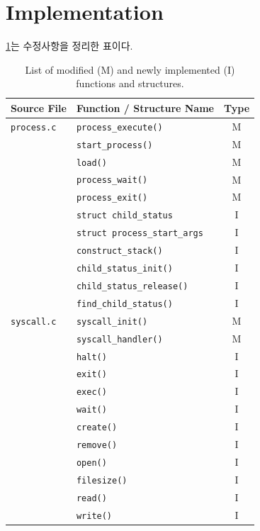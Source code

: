 \documentclass[conference]{IEEEtran}
\newcommand{\codefont}[1]{\texttt{\color{darkmagenta}#1}}
\begin{document}
\section{Implementation}
\cref{tab:implementation_list}는 수정사항을 정리한 표이다.
\begin{table}[htbp]
    \centering
    \caption{List of modified (M) and newly implemented (I) functions and structures.}
    \label{tab:implementation_list}
    \begin{tabular}{llc}
        \toprule
        \textbf{Source File} & \textbf{Function / Structure Name} & \textbf{Type} \\
        \midrule
        \texttt{process.c} & \codefont{process\_execute()} & M \\
        & \codefont{start\_process()} & M \\
        & \codefont{load()} & M \\
        & \codefont{process\_wait()} & M \\
        & \codefont{process\_exit()} & M \\
        & \codefont{struct child\_status} & I \\
        & \codefont{struct process\_start\_args} & I \\
        & \codefont{construct\_stack()} & I \\
        & \codefont{child\_status\_init()} & I \\
        & \codefont{child\_status\_release()} & I \\
        & \codefont{find\_child\_status()} & I \\
        \midrule
        \texttt{syscall.c} & \codefont{syscall\_init()} & M \\
        & \codefont{syscall\_handler()} & M \\
        & \codefont{halt()} & I \\
        & \codefont{exit()} & I \\
        & \codefont{exec()} & I \\
        & \codefont{wait()} & I \\
        & \codefont{create()} & I \\
        & \codefont{remove()} & I \\
        & \codefont{open()} & I \\
        & \codefont{filesize()} & I \\
        & \codefont{read()} & I \\
        & \codefont{write()} & I \\

\end{tabular}
\end{table}
\end{document}
